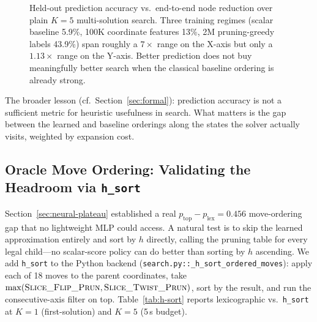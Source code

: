 \documentclass[graybox]{svmult}
\begin{document}
\begin{figure}[!t]
\centering
{}
\caption{Held-out prediction accuracy vs.\ end-to-end node reduction over plain $K{=}5$ multi-solution search. Three training regimes (scalar baseline 5.9\%, 100K coordinate features 13\%, 2M pruning-greedy labels 43.9\%) span roughly a $7\times$ range on the X-axis but only a $1.13\times$ range on the Y-axis. Better prediction does not buy meaningfully better search when the classical baseline ordering is already strong.}
\label{fig:acc-vs-node}
\end{figure}

The broader lesson (cf.\ Section~\ref{sec:formal}): prediction accuracy is not a sufficient metric for heuristic usefulness in search. What matters is the gap between the learned and baseline orderings along the states the solver actually visits, weighted by expansion cost.

\subsection{Oracle Move Ordering: Validating the Headroom via \texttt{h\_sort}}
\label{sec:h-sort}

Section~\ref{sec:neural-plateau} established a real $p_{\text{top}} - p_{\text{lex}} = 0.456$ move-ordering gap that no lightweight MLP could access. A natural test is to skip the learned approximation entirely and sort by $h$ directly, calling the pruning table for every legal child---no scalar-score policy can do better than sorting by $h$ ascending. We add \texttt{h\_sort} to the Python backend (\texttt{search.py::\allowbreak \_h\_sort\_ordered\_moves}): apply each of 18 moves to the parent coordinates, take $\max(\textsc{Slice\_Flip\_Prun},\allowbreak\textsc{Slice\_Twist\_Prun})$, sort by the result, and run the consecutive-axis filter on top. Table~\ref{tab:h-sort} reports lexicographic vs.\ \texttt{h\_sort} at $K{=}1$ (first-solution) and $K{=}5$ (5\,s budget).
\end{document}
